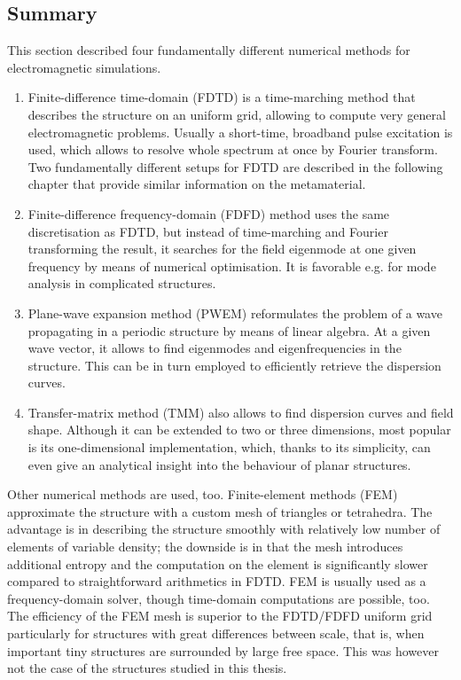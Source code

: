 \paragraph{} %
\subsection{Summary} %
This section described four fundamentally different numerical methods for electromagnetic simulations. 
\begin{enumerate}
\item{Finite-difference time-domain (FDTD) is a time-marching method that describes the structure on an uniform grid, allowing to compute very general electromagnetic problems. Usually a short-time, broadband pulse excitation is used, which allows to resolve whole spectrum at once by Fourier transform. Two fundamentally different setups for FDTD are described in the following chapter that provide similar information on the metamaterial.} 
\item{Finite-difference frequency-domain (FDFD) method uses the same discretisation as FDTD, but instead of time-marching and Fourier transforming the result, it searches for the field eigenmode at one given frequency by means of numerical optimisation. It is favorable e.g. for mode analysis in complicated structures.} 
\item{Plane-wave expansion method (PWEM) reformulates the problem of a wave propagating in a periodic structure by means of linear algebra. At a given wave vector, it allows to find eigenmodes and eigenfrequencies in the structure. This can be in turn employed to efficiently retrieve the dispersion curves.} 
\item{Transfer-matrix method (TMM) also allows to find dispersion curves and field shape. Although it can be extended to two or three dimensions, most popular is its one-dimensional implementation, which, thanks to its simplicity, can even give an analytical insight into the behaviour of planar structures.} 
\end{enumerate}
Other numerical methods are used, too. Finite-element methods (FEM) approximate the structure with a custom mesh of triangles or tetrahedra. The advantage is in describing the structure smoothly with relatively low number of elements of variable density; the downside is in that the mesh introduces additional entropy and the computation on the element is significantly slower compared to straightforward arithmetics in FDTD. FEM is usually used as a frequency-domain solver, though time-domain computations are possible, too. The efficiency of the FEM mesh is superior to the FDTD/FDFD uniform grid particularly for structures with great differences between scale, that is, when important tiny structures are surrounded by large free space. This was however not the case of the structures studied in this thesis.

